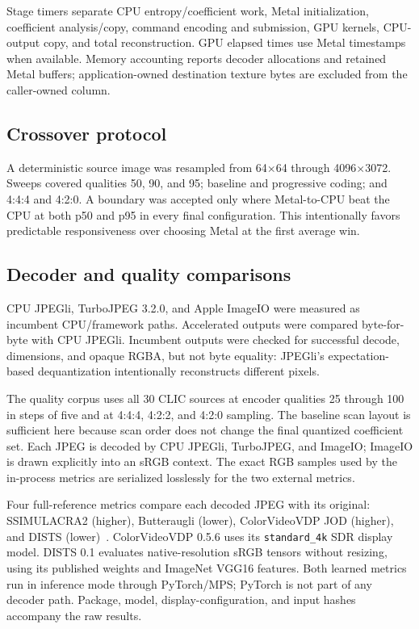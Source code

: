 \documentclass[10pt,twocolumn]{article}
\newcommand{\code}[1]{\texttt{#1}}
\begin{document}
Stage timers separate CPU entropy/coefficient work, Metal initialization,
coefficient analysis/copy, command encoding and submission, GPU kernels,
CPU-output copy, and total reconstruction.  GPU elapsed times use Metal
timestamps when available.  Memory accounting reports decoder allocations and
retained Metal buffers; application-owned destination texture bytes are
excluded from the caller-owned column.

\subsection{Crossover protocol}

A deterministic source image was resampled from 64$\times$64 through
4096$\times$3072.  Sweeps covered qualities 50, 90, and 95; baseline and
progressive coding; and 4:4:4 and 4:2:0.  A boundary was accepted only where
Metal-to-CPU beat the CPU at both p50 and p95 in every final configuration.
This intentionally favors predictable responsiveness over choosing Metal at
the first average win.

\subsection{Decoder and quality comparisons}

CPU JPEGli, TurboJPEG 3.2.0, and Apple ImageIO were measured as incumbent
CPU/framework paths.  Accelerated outputs were compared byte-for-byte with
CPU JPEGli.  Incumbent outputs were checked for successful decode, dimensions,
and opaque RGBA, but not byte equality: JPEGli's expectation-based
dequantization intentionally reconstructs different pixels.

The quality corpus uses all 30 CLIC sources at encoder qualities 25 through
100 in steps of five and at 4:4:4, 4:2:2, and 4:2:0 sampling.  The baseline
scan layout is sufficient here because scan order does not change the final
quantized coefficient set.  Each JPEG is decoded by CPU JPEGli, TurboJPEG,
and ImageIO; ImageIO is drawn explicitly into an sRGB context.  The exact RGB
samples used by the in-process metrics are serialized losslessly for the two
external metrics.

Four full-reference metrics compare each decoded JPEG with its original:
SSIMULACRA2 (higher), Butteraugli (lower), ColorVideoVDP JOD (higher), and
DISTS (lower)~\cite{ssimulacra2,butteraugli,colorvideovdp,dists}.
ColorVideoVDP 0.5.6 uses its \code{standard\_4k} SDR display model.  DISTS
0.1 evaluates native-resolution sRGB tensors without resizing, using its
published weights and ImageNet VGG16 features.  Both learned metrics run in
inference mode through PyTorch/MPS; PyTorch is not part of any decoder path.
Package, model, display-configuration, and input hashes accompany the raw
results.
\end{document}
